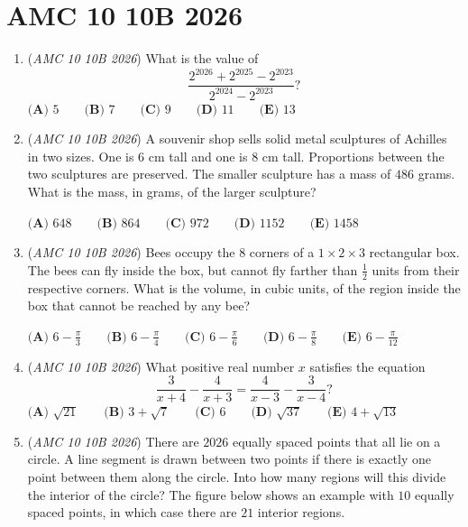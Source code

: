 \section{AMC 10 10B 2026}
        \begin{enumerate}
        	\item (\textit{AMC 10 10B 2026}) What is the value of 
 \[\frac{2^{2026}+2^{2025}-2^{2023}}{2^{2024}-2^{2023}}?\]
$\textbf{(A) } 5 \qquad \textbf{(B) } 7 \qquad \textbf{(C) } 9 \qquad \textbf{(D) } 11 \qquad \textbf{(E) } 13$


	\item (\textit{AMC 10 10B 2026}) A souvenir shop sells solid metal sculptures of Achilles in two sizes. One is $6$ cm tall and one is $8$ cm tall. Proportions between the two sculptures are preserved. The smaller sculpture has a mass of $486$ grams. What is the mass, in grams, of the larger sculpture?


 $\textbf{(A) } 648 \qquad \textbf{(B) } 864 \qquad \textbf{(C) } 972 \qquad \textbf{(D) } 1152 \qquad \textbf{(E) } 1458$


	\item (\textit{AMC 10 10B 2026}) Bees occupy the $8$ corners of a $1\times 2\times 3$ rectangular box. The bees can fly inside the box, but cannot fly farther than $\frac{1}{2}$ units from their respective corners. What is the volume, in cubic units, of the region inside the box that cannot be reached by any bee?


 $\textbf{(A) } 6-\frac{\pi}{3} \qquad \textbf{(B) } 6-\frac{\pi}{4} \qquad \textbf{(C) } 6-\frac{\pi}{6} \qquad \textbf{(D) } 6-\frac{\pi}{8} \qquad \textbf{(E) } 6-\frac{\pi}{12}$


	\item (\textit{AMC 10 10B 2026}) What positive real number $x$ satisfies the equation 
 \[\frac{3}{x+4}-\frac{4}{x+3}=\frac{4}{x-3}-\frac{3}{x-4}?\]
$\textbf{(A) } \sqrt{21} \qquad \textbf{(B) } 3+\sqrt{7} \qquad \textbf{(C) } 6 \qquad \textbf{(D) } \sqrt{37} \qquad \textbf{(E) } 4+\sqrt{13}$


	\item (\textit{AMC 10 10B 2026}) There are $2026$ equally spaced points that all lie on a circle. A line segment is drawn between two points if there is exactly one point between them along the circle. Into how many regions will this divide the interior of the circle? The figure below shows an example with $10$ equally spaced points, in which case there are $21$ interior regions.



\end{enumerate}
